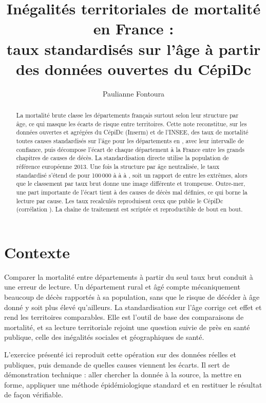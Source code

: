 \documentclass[11pt,a4paper]{article}
\title{Inégalités territoriales de mortalité en France :\\
taux standardisés sur l'âge à partir des données ouvertes du CépiDc}
\author{Paulianne Fontoura}
\date{}
\begin{document}
\maketitle

\begin{abstract}
\noindent
La mortalité brute classe les départements français surtout selon leur structure
par âge, ce qui masque les écarts de risque entre territoires. Cette note
reconstitue, sur les données ouvertes et agrégées du CépiDc (Inserm) et de
l'INSEE, des taux de mortalité toutes causes standardisés sur l'âge pour les
\nDep{} départements en \annee, avec leur intervalle de confiance, puis décompose
l'écart de chaque département à la France entre les grands chapitres de causes
de décès. La standardisation directe utilise la population de référence
européenne 2013. Une fois la structure par âge neutralisée, le taux standardisé
s'étend de \basStd{} pour 100\,000 à \basNom{} à \hautStd{} à \hautNom, soit un
rapport de \rapportExtremes{} entre les extrêmes, alors que le classement par taux
brut donne une image différente et trompeuse. Outre-mer, une part importante de
l'écart tient à des causes de décès mal définies, ce qui borne la lecture par
cause. Les taux recalculés reproduisent ceux que publie le CépiDc (corrélation
\ctrlCor). La chaîne de traitement est scriptée et reproductible de bout en bout.
\end{abstract}

\section{Contexte}
Comparer la mortalité entre départements à partir du seul taux brut conduit à
une erreur de lecture. Un département rural et âgé compte mécaniquement beaucoup
de décès rapportés à sa population, sans que le risque de décéder à âge donné y
soit plus élevé qu'ailleurs. La standardisation sur l'âge corrige cet effet et
rend les territoires comparables. Elle est l'outil de base des comparaisons de
mortalité, et sa lecture territoriale rejoint une question suivie de près en
santé publique, celle des inégalités sociales et géographiques de santé.

L'exercice présenté ici reproduit cette opération sur des données réelles et
publiques, puis demande de quelles causes viennent les écarts. Il sert de
démonstration technique : aller chercher la donnée à la source, la mettre en
forme, appliquer une méthode épidémiologique standard et en restituer le
résultat de façon vérifiable.
\end{document}
